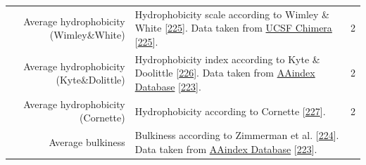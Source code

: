 \documentclass[11pt,a4paper,twoside]{book}
\theoremstyle{definition}
\theoremstyle{definition}
\theoremstyle{remark}
\begin{document}
\begin{longtable}[]{@{}rlc@{}}
\begin{minipage}[t]{0.23\columnwidth}
Average hydrophobicity (Wimley\&White)\strut
\end{minipage} & \begin{minipage}[t]{0.50\columnwidth}\raggedright\strut
Hydrophobicity scale according to Wimley \& White
{[}\protect\hyperlink{ref-Wimley1996}{225}{]}. Data taken from
\href{https://www.cgl.ucsf.edu/chimera/docs/ContributedSoftware/defineattrib/wwHydrophobicity.txt}{UCSF
Chimera} {[}\protect\hyperlink{ref-Wimley1996}{225}{]}.\strut
\end{minipage} & \begin{minipage}[t]{0.18\columnwidth}\centering\strut
2\strut
\end{minipage}\tabularnewline
\begin{minipage}[t]{0.23\columnwidth}\raggedleft\strut
Average hydrophobicity (Kyte\&Dolittle)\strut
\end{minipage} & \begin{minipage}[t]{0.50\columnwidth}\raggedright\strut
Hydrophobicity index according to Kyte \& Doolittle
{[}\protect\hyperlink{ref-Kyte1982}{226}{]}. Data taken from
\href{http://www.genome.jp/dbget-bin/www_bget?aaindex:KYTJ820101}{AAindex
Database} {[}\protect\hyperlink{ref-Kawashima2008}{223}{]}.\strut
\end{minipage} & \begin{minipage}[t]{0.18\columnwidth}\centering\strut
2\strut
\end{minipage}\tabularnewline
\begin{minipage}[t]{0.23\columnwidth}\raggedleft\strut
Average hydrophobicity (Cornette)\strut
\end{minipage} & \begin{minipage}[t]{0.50\columnwidth}\raggedright\strut
Hydrophobicity according to Cornette
{[}\protect\hyperlink{ref-Cornette1987}{227}{]}.\strut
\end{minipage} & \begin{minipage}[t]{0.18\columnwidth}\centering\strut
2\strut
\end{minipage}\tabularnewline
\begin{minipage}[t]{0.23\columnwidth}\raggedleft\strut
Average bulkiness\strut
\end{minipage} & \begin{minipage}[t]{0.50\columnwidth}\raggedright\strut
Bulkiness according to Zimmerman et al.
{[}\protect\hyperlink{ref-Zimmerman1968}{224}{]}. Data taken from
\href{http://www.genome.jp/dbget-bin/www_bget?aaindex:ZIMJ680102}{AAindex
Database} {[}\protect\hyperlink{ref-Kawashima2008}{223}{]}.\strut

\end{minipage}
\end{longtable}
\end{document}
